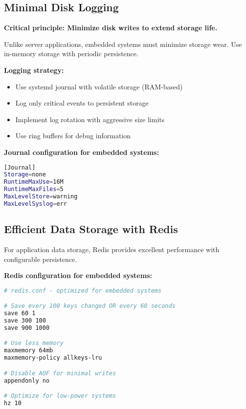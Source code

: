 \subsection{Minimal Disk Logging}

\textbf{Critical principle: Minimize disk writes to extend storage life.}

Unlike server applications, embedded systems must minimize storage wear. Use in-memory storage with periodic persistence.

\textbf{Logging strategy:}
\begin{itemize}
\item Use systemd journal with volatile storage (RAM-based)
\item Log only critical events to persistent storage
\item Implement log rotation with aggressive size limits
\item Use ring buffers for debug information
\end{itemize}

\textbf{Journal configuration for embedded systems:}
\begin{tcolorbox}[colback=gray!5,colframe=gray!50,title=/etc/systemd/journald.conf]
\begin{lstlisting}[language=bash,basicstyle=\small\ttfamily]
[Journal]
Storage=none
RuntimeMaxUse=16M
RuntimeMaxFiles=5
MaxLevelStore=warning
MaxLevelSyslog=err
\end{lstlisting}
\end{tcolorbox}

\subsection{Efficient Data Storage with Redis}

For application data storage, Redis provides excellent performance with configurable persistence.

\textbf{Redis configuration for embedded systems:}
\begin{tcolorbox}[colback=gray!5,colframe=gray!50,title=Redis Persistence Configuration]
\begin{lstlisting}[language=bash,basicstyle=\small\ttfamily]
# redis.conf - optimized for embedded systems

# Save every 100 keys changed OR every 60 seconds
save 60 1
save 300 100
save 900 1000

# Use less memory
maxmemory 64mb
maxmemory-policy allkeys-lru

# Disable AOF for minimal writes
appendonly no

# Optimize for low-power systems
hz 10
\end{lstlisting}
\end{tcolorbox}

